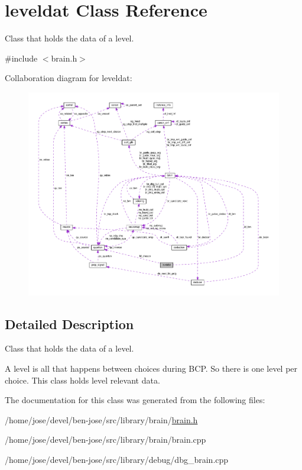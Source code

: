 \hypertarget{classleveldat}{\section{leveldat Class Reference}
\label{classleveldat}
}


Class that holds the data of a level.  




{\ttfamily \#include $<$brain.\+h$>$}



Collaboration diagram for leveldat\+:\nopagebreak
\begin{figure}[H]
\begin{center}
\leavevmode
\includegraphics[width=350pt]{d1/de5/classleveldat__coll__graph}
\end{center}
\end{figure}


\subsection{Detailed Description}
Class that holds the data of a level. 

A level is all that happens between choices during B\+C\+P. So there is one level per choice. This class holds level relevant data. 

The documentation for this class was generated from the following files\+:\begin{DoxyCompactItemize}
\item 
/home/jose/devel/ben-\/jose/src/library/brain/\hyperlink{brain_8h}{brain.\+h}\item 
/home/jose/devel/ben-\/jose/src/library/brain/brain.\+cpp\item 
/home/jose/devel/ben-\/jose/src/library/debug/dbg\+\_\+brain.\+cpp\end{DoxyCompactItemize}
